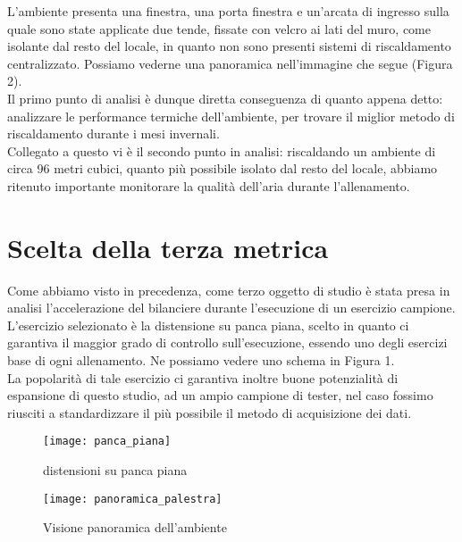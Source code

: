 \documentclass[fleqn,10pt]{SelfArx} %
\begin{document}
L'ambiente presenta una finestra, una porta finestra e un'arcata di ingresso sulla quale sono state applicate 
due tende, fissate con velcro ai lati del muro, come isolante dal resto del locale, in quanto non 
sono presenti sistemi di riscaldamento centralizzato. Possiamo vederne una panoramica nell'immagine che segue 
(Figura 2). \\

Il primo punto di analisi è dunque diretta conseguenza di quanto appena detto: analizzare le performance 
termiche dell'ambiente, per trovare il miglior metodo di riscaldamento durante i mesi invernali.\\
Collegato a questo vi è il secondo punto in analisi: riscaldando un ambiente di circa 96 metri cubici, quanto 
più possibile isolato dal resto del locale, abbiamo ritenuto importante monitorare la qualità dell'aria 
durante l'allenamento.

\section{Scelta della terza metrica}
Come abbiamo visto in precedenza, come terzo oggetto di studio è stata presa in analisi l'accelerazione del bilanciere 
durante l'esecuzione di un esercizio campione.\\
L'esercizio selezionato è la distensione su panca piana, scelto in quanto ci garantiva il maggior grado di controllo 
sull'esecuzione, essendo uno degli esercizi base di ogni allenamento. Ne possiamo vedere uno schema in Figura 1.\\

La popolarità di tale esercizio ci garantiva inoltre buone potenzialità di espansione di questo studio, ad un 
ampio campione di tester, nel caso fossimo riusciti a standardizzare il più possibile il metodo di acquisizione dei dati.

\begin{figure}[htb!]\centering
	\texttt{[image: panca\_piana]}
	\caption{distensioni su panca piana}
	\label{fig:panca_piana}
\end{figure}

\begin{figure*}[ht]\centering %
	\texttt{[image: panoramica\_palestra]}
	\caption{Visione panoramica dell'ambiente}
	\label{fig:view}
\end{figure*}
\end{document}
